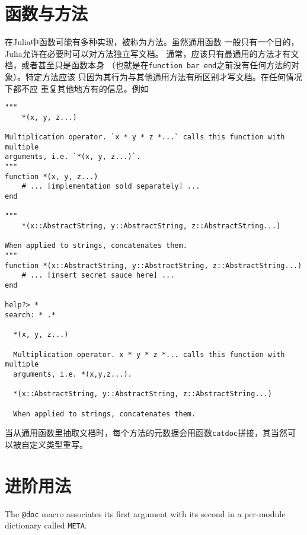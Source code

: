\hypertarget{5384792468741396562}{}


\section{函数与方法}



在Julia中函数可能有多种实现，被称为方法。虽然通用函数 一般只有一个目的，Julia允许在必要时可以对方法独立写文档。 通常，应该只有最通用的方法才有文档，或者甚至只是函数本身 （也就是在\texttt{function bar end}之前没有任何方法的对象）。特定方法应该 只因为其行为与其他通用方法有所区别才写文档。在任何情况下都不应 重复其他地方有的信息。例如




\begin{verbatim}
"""
    *(x, y, z...)

Multiplication operator. `x * y * z *...` calls this function with multiple
arguments, i.e. `*(x, y, z...)`.
"""
function *(x, y, z...)
    # ... [implementation sold separately] ...
end

"""
    *(x::AbstractString, y::AbstractString, z::AbstractString...)

When applied to strings, concatenates them.
"""
function *(x::AbstractString, y::AbstractString, z::AbstractString...)
    # ... [insert secret sauce here] ...
end

help?> *
search: * .*

  *(x, y, z...)

  Multiplication operator. x * y * z *... calls this function with multiple
  arguments, i.e. *(x,y,z...).

  *(x::AbstractString, y::AbstractString, z::AbstractString...)

  When applied to strings, concatenates them.
\end{verbatim}



当从通用函数里抽取文档时，每个方法的元数据会用函数\texttt{catdoc}拼接，其当然可以被自定义类型重写。



\hypertarget{9947466122062338539}{}


\section{进阶用法}



The \texttt{@doc} macro associates its first argument with its second in a per-module dictionary called \texttt{META}.



